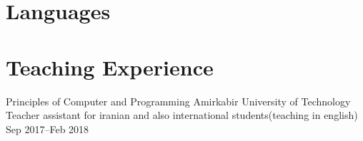 \documentclass[11pt, a4paper, color, final]{moderncv}
\begin{document}
\section{Languages}


\section{Teaching Experience}

\cventry{}
  {Principles of Computer and Programming}
  {}
  {Amirkabir University of Technology}
  {Teacher assistant for iranian and also international students(teaching in english)}
  {Sep 2017--Feb 2018}
\end{document}
